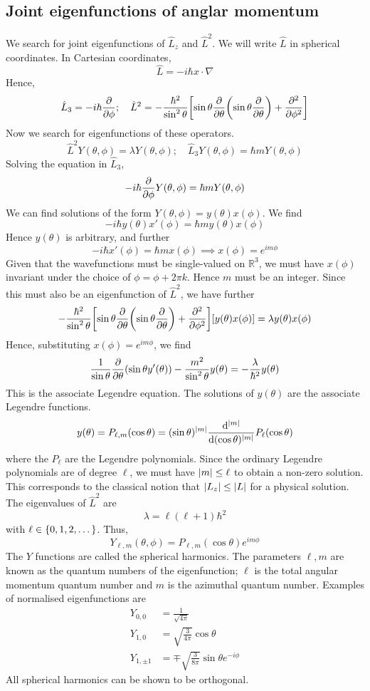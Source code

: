 \subsection{Joint eigenfunctions of anglar momentum}
We search for joint eigenfunctions of \( \hat L_z \) and \( \hat L^2 \).
We will write \( \hat L \) in spherical coordinates.
In Cartesian coordinates,
\[
	\hat L = -i \hbar x \cdot \nabla
\]
Hence,
\[
	\hat L_3 = -i \hbar \pdv{\phi};\quad \hat L^2 = -\frac{\hbar^2}{\sin^2 \theta} \qty[\sin \theta \pdv{\theta} \qty(\sin \theta \pdv{\theta}) + \pdv[2]{\phi} ]
\]
Now we search for eigenfunctions of these operators.
\[
	\hat L^2 Y(\theta, \phi) = \lambda Y(\theta, \phi);\quad \hat L_3 Y(\theta, \phi) = \hbar m Y(\theta, \phi)
\]
Solving the equation in \( \hat L_3 \),
\[
	-i\hbar \pdv{\phi} Y(\theta, \phi) = \hbar m Y(\theta, \phi)
\]
We can find solutions of the form \( Y(\theta, \phi) = y(\theta)x(\phi) \).
We find
\[
	-i\hbar y(\theta) x'(\phi) = \hbar m y(\theta) x(\phi)
\]
Hence \( y(\theta) \) is arbitrary, and further
\[
	-i\hbar x'(\phi) = \hbar m x(\phi) \implies x(\phi) = e^{i m \phi}
\]
Given that the wavefunctions must be single-valued on \( \mathbb R^3 \), we must have \( x(\phi) \) invariant under the choice of \( \phi = \phi + 2\pi k \).
Hence \( m \) must be an integer.
Since this must also be an eigenfunction of \( \hat L^2 \), we have further
\[
	-\frac{\hbar^2}{\sin^2 \theta} \qty[\sin \theta \pdv{\theta} \qty(\sin \theta \pdv{\theta}) + \pdv[2]{\phi} ] [y(\theta) x(\phi)] = \lambda y(\theta) x(\phi)
\]
Hence, substituting \( x(\phi) = e^{i m \phi} \), we find
\[
	\frac{1}{\sin \theta} \pdv{\theta} \qty(\sin \theta y'(\theta)) - \frac{m^2}{\sin^2 \theta} y(\theta) = - \frac{\lambda}{\hbar^2} y(\theta)
\]
This is the associate Legendre equation.
The solutions of \( y(\theta) \) are the associate Legendre functions.
\[
	y(\theta) = P_{\ell,m}(\cos \theta) = (\sin \theta)^{\abs{m}} \dv[\abs{m}]{(\cos \theta)}  P_\ell(\cos \theta)
\]
where the \( P_\ell \) are the Legendre polynomials.
Since the ordinary Legendre polynomials are of degree \( \ell \), we must have \( \abs{m} \leq \ell \) to obtain a non-zero solution.
This corresponds to the classical notion that \( \abs{L_z} \leq \abs{L} \) for a physical solution.
The eigenvalues of \( \hat L^2 \) are
\[
	\lambda = \ell(\ell+1) \hbar^2
\]
with \( \ell \in \qty{0, 1, 2, \dots} \).
Thus,
\[
	Y_{\ell, m}(\theta, \phi) = P_{\ell,m}(\cos\theta) e^{im\phi}
\]
The \( Y \) functions are called the spherical harmonics.
The parameters \( \ell, m \) are known as the quantum numbers of the eigenfunction; \( \ell \) is the total angular momentum quantum number and \( m \) is the azimuthal quantum number.
Examples of normalised eigenfunctions are
\begin{align*}
	Y_{0,0}     & = \frac{1}{\sqrt{4 \pi}}                             \\
	Y_{1,0}     & = \sqrt{\frac{3}{4 \pi}} \cos \theta                 \\
	Y_{1,\pm 1} & = \mp \sqrt{\frac{3}{8 \pi}} \sin \theta e^{-i \phi}
\end{align*}
All spherical harmonics can be shown to be orthogonal.


